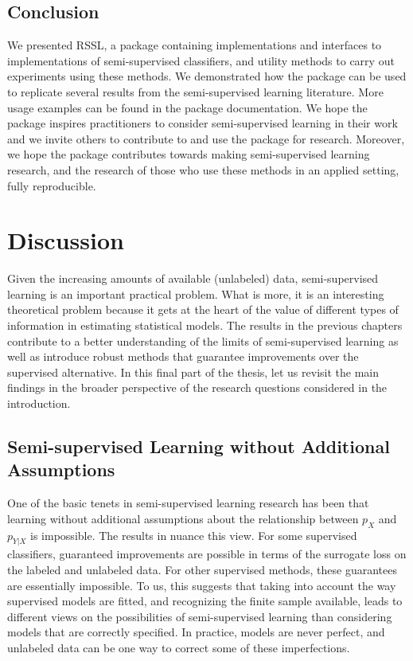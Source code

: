 \documentclass[twoside]{memoir}\usepackage[]{graphicx}\usepackage{xcolor}
\begin{document}
\section{Conclusion}
We presented RSSL, a package containing implementations and interfaces to implementations of semi-supervised classifiers, and utility methods to carry out experiments using these methods. We demonstrated how the package can be used to replicate several results from the semi-supervised learning literature. More usage examples can be found in the package documentation. We hope the package inspires practitioners to consider semi-supervised learning in their work and we invite others to contribute to and use the package for research. Moreover, we hope the package contributes towards making semi-supervised learning research, and the research of those who use these methods in an applied setting, fully reproducible.

\backmatter




\chapter[Discussion]{Discussion}

Given the increasing amounts of available (unlabeled) data, semi-supervised learning is an important practical problem. What is more, it is an interesting theoretical problem because it gets at the heart of the value of different types of information in estimating statistical models. The results in the previous chapters contribute to a better understanding of the limits of semi-supervised learning as well as introduce robust methods that guarantee improvements over the supervised alternative. In this final part of the thesis, let us revisit the main findings in the broader perspective of the research questions considered in the introduction.

\section{Semi-supervised Learning without Additional Assumptions}
One of the basic tenets in semi-supervised learning research has been that learning without additional assumptions about the relationship between $p_X$ and $p_{Y|X}$ is impossible. The results in  nuance this view. For some supervised classifiers, guaranteed improvements are possible in terms of the surrogate loss on the labeled and unlabeled data. For other supervised methods, these guarantees are essentially impossible. To us, this suggests that taking into account the way supervised models are fitted, and recognizing the finite sample available, leads to different views on the possibilities of semi-supervised learning than considering models that are correctly specified. In practice, models are never perfect, and unlabeled data can be one way to correct some of these imperfections.
\end{document}
